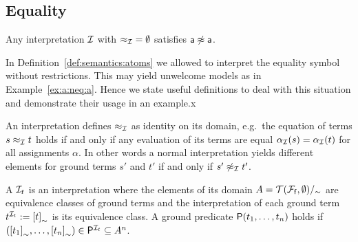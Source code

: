 \subsection{Equality}

\begin{example}\label{ex:a:neq:a}
	Any interpretation \( \mathcal{I} \)
	with \( {\approx_{\mathcal{I}}} = \emptyset \) satisfies \( \mathsf{a}\not\approx\mathsf{a} \).
\end{example}

\noindent In Definition~\vref{def:semantics:atoms} we allowed
to interpret the equality symbol without restrictions.
This may yield unwelcome models as in Example~\vref{ex:a:neq:a}.
Hence we state useful definitions to deal with this situation
and demonstrate their usage in an example.x


\begin{definition}\label{def:normal:interpreation}
	An  interpretation defines \( \approx_{\mathcal{I}} \) as identity on its domain,
	e.g.~the equation of terms \( s \approx_{\mathcal{I}} t \) holds if and only
	if any evaluation of its terms are equal \( \alpha_{\mathcal{I}}(s) = \alpha_{\mathcal{I}}(t) \)
	for all assignments \( \alpha \).
	In other words a normal interpretation yields different elements
	for ground terms \( s' \) and \( t' \) if and only if \( s'\not\approx_{\mathcal{I}} t' \).
\end{definition}

\begin{definition}
	A 
	\( \mathcal{I}_t \)
	is an interpretation
	where the elements of its domain \( A = {\mathcal{T}(\mathcal{F}_{\mathsf{f}},\emptyset)}/_\sim \)
	are equivalence classes of ground terms
	and the interpretation of each ground term \( t^{\mathcal{I}_t} := {[t]}_\sim \) is its equivalence class.
	A ground predicate \( \mathsf{P}(t_1,\ldots,t_n) \) holds if
	\( ({[t_1]}_\sim,\ldots,{[t_n]}_\sim) \in \mathsf{P}^{\mathcal{I}_t} \subseteq A^n \).
\end{definition}


